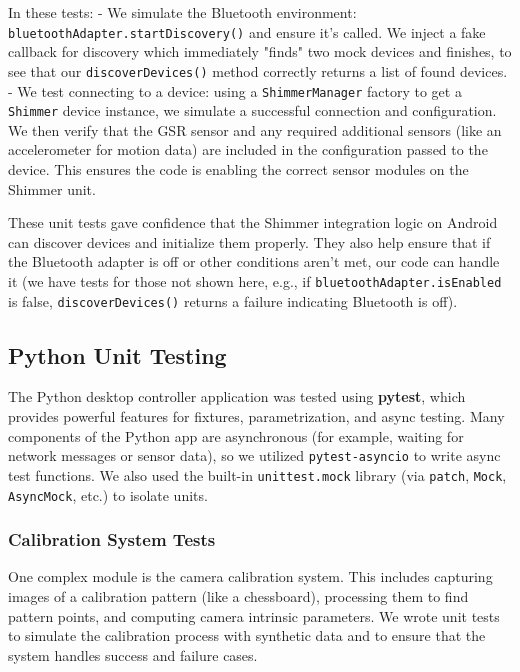 In these tests: - We simulate the Bluetooth environment:
\texttt{bluetoothAdapter.startDiscovery()} and ensure it's called. We inject a
fake callback for discovery which immediately "finds" two mock devices
and finishes, to see that our \texttt{discoverDevices()} method correctly
returns a list of found devices. - We test connecting to a device: using
a \texttt{ShimmerManager} factory to get a \texttt{Shimmer} device instance, we
simulate a successful connection and configuration. We then verify that
the GSR sensor and any required additional sensors (like an
accelerometer for motion data) are included in the configuration passed
to the device. This ensures the code is enabling the correct sensor
modules on the Shimmer unit.

These unit tests gave confidence that the Shimmer integration logic on
Android can discover devices and initialize them properly. They also
help ensure that if the Bluetooth adapter is off or other conditions
aren't met, our code can handle it (we have tests for those not shown
here, e.g., if \texttt{bluetoothAdapter.isEnabled} is false,
\texttt{discoverDevices()} returns a failure indicating Bluetooth is off).

\subsection{Python Unit Testing}

The Python desktop controller application was tested using \textbf{pytest},
which provides powerful features for fixtures, parametrization, and
async testing. Many components of the Python app are asynchronous (for
example, waiting for network messages or sensor data), so we utilized
\texttt{pytest-asyncio} to write async test functions. We also used the
built-in \texttt{unittest.mock} library (via \texttt{patch}, \texttt{Mock}, \texttt{AsyncMock},
etc.) to isolate units.

\subsubsection{Calibration System Tests}

One complex module is the camera calibration system. This includes
capturing images of a calibration pattern (like a chessboard),
processing them to find pattern points, and computing camera intrinsic
parameters. We wrote unit tests to simulate the calibration process with
synthetic data and to ensure that the system handles success and failure
cases.


